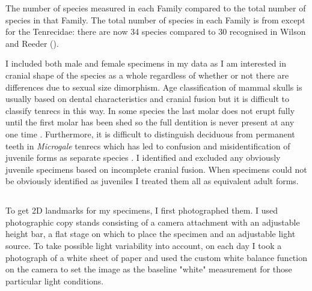 
\begin{table}[h]
	\caption[Species measured] 
	{The number of species measured in each Family compared to the total number of species in that Family. The total number of species in each Family is from \citet{Wilson2005} except for the Tenrecidae: there are now 34 species compared to 30 recognised in Wilson and Reeder (\citeyear{Wilson2005}).}
		
	\label{tab:species.measured}
\end{table}
 

	I included both male and female specimens in my data as I am interested in cranial shape of the species as a whole regardless of whether or not there are differences due to sexual size dimorphism. Age classification of mammal skulls is usually based on dental characteristics and cranial fusion but it is difficult to classify tenrecs in this way. In some species the last molar does not erupt fully until the first molar has been shed so the full dentition is never present at any one time \citep{Nowak1983}. Furthermore, it is difficult to distinguish deciduous from permanent teeth in \textit{Microgale} tenrecs \citep{Asher2008} which has led to confusion and misidentification of juvenile forms as separate species \citep{Olson2004}.
	I identified and excluded any obviously juvenile specimens based on incomplete cranial fusion. When specimens could not be obviously identified as juveniles I treated them all as equivalent adult forms. 	



\subsection{}

	To get 2D landmarks for my specimens, I first photographed them. I used photographic copy stands consisting of a camera attachment with an adjustable height bar, a flat stage on which to place the specimen and an adjustable light source. To take possible light variability into account, on each day I took a photograph of a white sheet of paper and used the custom white balance function on the camera to set the image as the baseline "white" measurement for those particular light conditions.
	
